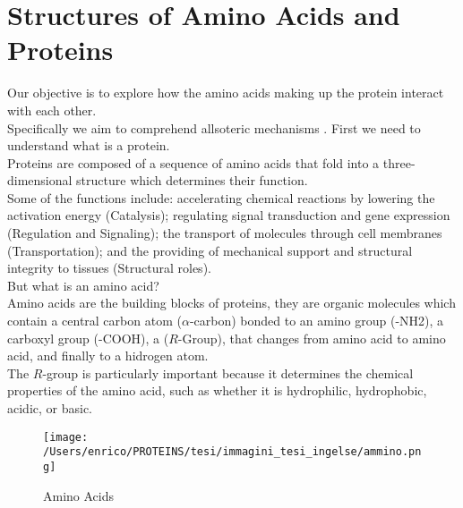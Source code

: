 \documentclass[English, Lau, oneside]{sapthesis}
\begin{document}
\section{Structures of Amino Acids and Proteins}
\noindent 
Our objective is to explore how the amino acids making up the protein interact with each other.\\
Specifically we aim to comprehend allsoteric mechanisms .
First we need to understand what is a protein.\\
Proteins are composed of a sequence of amino acids that fold into a three-dimensional structure which determines their function. \\
Some of the functions include: 
accelerating chemical reactions by lowering the activation energy (Catalysis);
regulating signal transduction and gene expression (Regulation and Signaling); 
the transport of molecules through cell membranes (Transportation);
and the providing of mechanical support and structural integrity to tissues (Structural roles).\\
But what is an amino acid?\\
Amino acids are the building blocks of proteins, they are organic molecules which contain a central carbon atom (\(\alpha\)-carbon) bonded to 
an amino group (-NH2), a carboxyl group (-COOH), a (\(R\)-Group), that changes from amino acid to amino acid, and finally to a hidrogen atom.\\
The \(R\)-group is particularly important because it determines the chemical properties of the amino acid, such as whether it is hydrophilic, hydrophobic, acidic, or basic.\\
\begin{figure}[H]
    \centering
    \texttt{[image: /Users/enrico/PROTEINS/tesi/immagini\_tesi\_ingelse/ammino.png]}
    \caption{Amino Acids}
\end{figure}
\newpage
\end{document}
